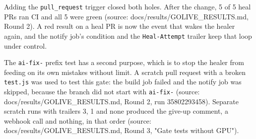 Adding the \texttt{pull\_\allowbreak{}request} trigger closed both holes. After the change, 5 of 5 heal PRs ran CI and all 5 were green (source: docs/\allowbreak{}results/\allowbreak{}GOLIVE\_\allowbreak{}RESULTS.md, Round 2). A red result on a heal PR is now the event that wakes the healer again, and the notify job's condition and the \texttt{Heal-\allowbreak{}Attempt} trailer keep that loop under control.

The \texttt{ai-\allowbreak{}fix-\allowbreak{}} prefix test has a second purpose, which is to stop the healer from feeding on its own mistakes without limit. A scratch pull request with a broken \texttt{test.\allowbreak{}js} was used to test this gate: the build job failed and the notify job was skipped, because the branch did not start with \texttt{ai-\allowbreak{}fix-\allowbreak{}} (source: docs/\allowbreak{}results/\allowbreak{}GOLIVE\_\allowbreak{}RESULTS.md, Round 2, run 35802293458). Separate scratch runs with trailers 3, 1 and none produced the give-up comment, a webhook call and nothing, in that order (source: docs/\allowbreak{}results/\allowbreak{}GOLIVE\_\allowbreak{}RESULTS.md, Round 3, "Gate tests without GPU").
